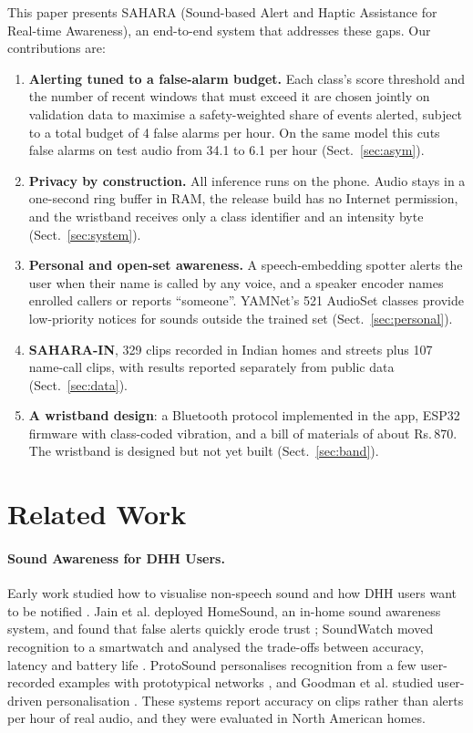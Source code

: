 \documentclass{svproc}
\newcommand{\INR}{Rs.\,}
\begin{document}
This paper presents SAHARA (Sound-based Alert and Haptic Assistance for Real-time Awareness), an end-to-end system that addresses these gaps. Our contributions are:
\begin{enumerate}
\item \textbf{Alerting tuned to a false-alarm budget.} Each class's score threshold and the number of recent windows that must exceed it are chosen jointly on validation data to maximise a safety-weighted share of events alerted, subject to a total budget of 4 false alarms per hour. On the same model this cuts false alarms on test audio from 34.1 to 6.1 per hour (Sect.~\ref{sec:asym}).
\item \textbf{Privacy by construction.} All inference runs on the phone. Audio stays in a one-second ring buffer in RAM, the release build has no Internet permission, and the wristband receives only a class identifier and an intensity byte (Sect.~\ref{sec:system}).
\item \textbf{Personal and open-set awareness.} A speech-embedding spotter alerts the user when their name is called by any voice, and a speaker encoder names enrolled callers or reports ``someone''. YAMNet's 521 AudioSet classes provide low-priority notices for sounds outside the trained set (Sect.~\ref{sec:personal}).
\item \textbf{SAHARA-IN}, 329 clips recorded in Indian homes and streets plus 107 name-call clips, with results reported separately from public data (Sect.~\ref{sec:data}).
\item \textbf{A wristband design}: a Bluetooth protocol implemented in the app, ESP32 firmware with class-coded vibration, and a bill of materials of about \INR 870. The wristband is designed but not yet built (Sect.~\ref{sec:band}).
\end{enumerate}

\section{Related Work}
\paragraph{Sound Awareness for DHH Users.} Early work studied how to visualise non-speech sound \cite{matthews2006} and how DHH users want to be notified \cite{bragg2016,findlater2019}. Jain et al. deployed HomeSound, an in-home sound awareness system, and found that false alerts quickly erode trust \cite{jain2020homesound}; SoundWatch moved recognition to a smartwatch and analysed the trade-offs between accuracy, latency and battery life \cite{jain2020soundwatch}. ProtoSound personalises recognition from a few user-recorded examples with prototypical networks \cite{jain2022protosound,snell2017}, and Goodman et al. studied user-driven personalisation \cite{goodman2021}. These systems report accuracy on clips rather than alerts per hour of real audio, and they were evaluated in North American homes.
\end{document}
